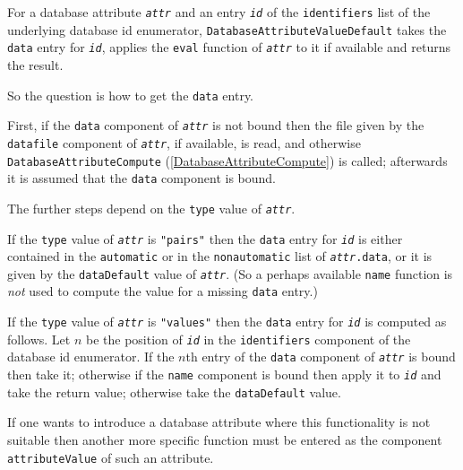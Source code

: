\documentclass[a4paper,11pt]{report}
\begin{document}
{{{ For a database attribute \mbox{\texttt{\mdseries\slshape attr}} and an entry \mbox{\texttt{\mdseries\slshape id}} of the \texttt{identifiers} list of the underlying database id enumerator, \texttt{DatabaseAttributeValueDefault} takes the \texttt{data} entry for \mbox{\texttt{\mdseries\slshape id}}, applies the \texttt{eval} function of \mbox{\texttt{\mdseries\slshape attr}} to it if available and returns the result. 

 So the question is how to get the \texttt{data} entry. 

 First, if the \texttt{data} component of \mbox{\texttt{\mdseries\slshape attr}} is not bound then the file given by the \texttt{datafile} component of \mbox{\texttt{\mdseries\slshape attr}}, if available, is read, and otherwise \texttt{DatabaseAttributeCompute} (\ref{DatabaseAttributeCompute}) is called; afterwards it is assumed that the \texttt{data} component is bound. 

 The further steps depend on the \texttt{type} value of \mbox{\texttt{\mdseries\slshape attr}}. 

 If the \texttt{type} value of \mbox{\texttt{\mdseries\slshape attr}} is \texttt{"pairs"} then the \texttt{data} entry for \mbox{\texttt{\mdseries\slshape id}} is either contained in the \texttt{automatic} or in the \texttt{nonautomatic} list of \mbox{\texttt{\mdseries\slshape attr}}\texttt{.data}, or it is given by the \texttt{dataDefault} value of \mbox{\texttt{\mdseries\slshape attr}}. (So a perhaps available \texttt{name} function is \emph{not} used to compute the value for a missing \texttt{data} entry.) 

 If the \texttt{type} value of \mbox{\texttt{\mdseries\slshape attr}} is \texttt{"values"} then the \texttt{data} entry for \mbox{\texttt{\mdseries\slshape id}} is computed as follows. Let $n$ be the position of \mbox{\texttt{\mdseries\slshape id}} in the \texttt{identifiers} component of the database id enumerator. If the $n$\texttt{}th entry of the \texttt{data} component of \mbox{\texttt{\mdseries\slshape attr}} is bound then take it; otherwise if the \texttt{name} component is bound then apply it to \mbox{\texttt{\mdseries\slshape id}} and take the return value; otherwise take the \texttt{dataDefault} value. 

 If one wants to introduce a database attribute where this functionality is not
suitable then another {\textendash}more specific{\textendash} function must be
entered as the component \texttt{attributeValue} of such an attribute. }

}}
\end{document}
